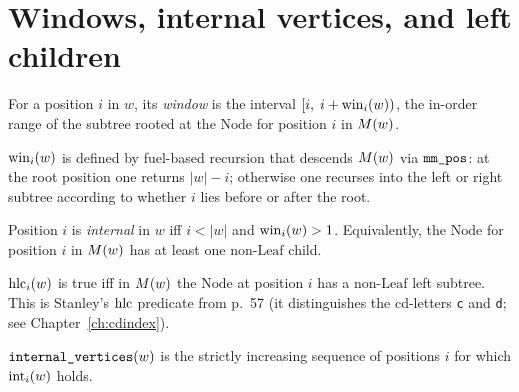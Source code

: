 \section{Windows, internal vertices, and left children}

For a position $i$ in $w$, its \emph{window} is the interval
$[i,\; i + \operatorname{win}_i(w))$, the in-order range of the subtree
rooted at the $\mathrm{Node}$ for position $i$ in $M(w)$.

\begin{definition}
  \label{def:window_size}
  \rocqok
  $\operatorname{win}_i(w)$ is defined by fuel-based recursion that descends
  $M(w)$ via $\texttt{mm\_pos}$: at the root position one returns
  $|w| - i$; otherwise one recurses into the left or right subtree
  according to whether $i$ lies before or after the root.
\end{definition}

\begin{definition}
  \label{def:is_internal}
  \rocqok
  Position $i$ is \emph{internal} in $w$ iff $i < |w|$ and
  $\operatorname{win}_i(w) > 1$.  Equivalently, the $\mathrm{Node}$ for
  position $i$ in $M(w)$ has at least one non-$\mathrm{Leaf}$
  child.
\end{definition}

\begin{definition}
  \label{def:has_left_child}
  \rocqok
  $\operatorname{hlc}_i(w)$ is true iff in $M(w)$ the $\mathrm{Node}$ at
  position $i$ has a non-$\mathrm{Leaf}$ left subtree.  This is
  Stanley's $\operatorname{hlc}$ predicate from p.~57 (it distinguishes the
  cd-letters \texttt{c} and \texttt{d}; see Chapter~\ref{ch:cdindex}).
\end{definition}

\begin{definition}
  \label{def:internal_vertices}
  \rocqok
  $\texttt{internal\_vertices}(w)$ is the strictly increasing sequence
  of positions $i$ for which $\operatorname{int}_i(w)$ holds.
\end{definition}

